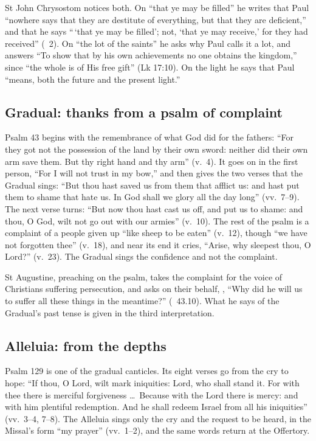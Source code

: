 St John Chrysostom notices both. On ``that ye may be filled'' he writes that
Paul ``nowhere says that they are destitute of everything, but that they are
deficient,'' and that he says ``\,`that ye may be filled'; not, `that ye may
receive,' for they had received'' (~2). On ``the lot of
the saints'' he asks why Paul calls it a lot, and answers ``To show that by
his own achievements no one obtains the kingdom,'' since ``the whole is of His
free gift'' (Lk 17:10). On the light he says that Paul ``means, both the future
and the present light.''

\subsection{Gradual: thanks from a psalm of complaint}
\label{sec:element-gradual}

Psalm 43 begins with the remembrance of what God did for the fathers: ``For
they got not the possession of the land by their own sword: neither did their
own arm save them. But thy right hand and thy arm'' (v.~4). It goes on in the
first person, ``For I will not trust in my bow,'' and then gives the two verses
that the Gradual sings: ``But thou hast saved us from them that afflict us:
and hast put them to shame that hate us. In God shall we glory all the day
long'' (vv.~7--9). The next verse turns: ``But now thou hast cast us off, and
put us to shame: and thou, O God, wilt not go out with our armies'' (v.~10).
The rest of the psalm is a complaint of a people given up ``like sheep to be
eaten'' (v.~12), though ``we have not forgotten thee'' (v.~18), and near its
end it cries, ``Arise, why sleepest thou, O Lord?'' (v.~23). The Gradual sings
the confidence and not the complaint.

St Augustine, preaching on the psalm, takes the complaint for the voice of
Christians suffering persecution, and asks on their behalf, , ``Why did he will us to suffer all
these things in the meantime?'' (~43.10). What he says of
the Gradual's past tense is given in the third interpretation.

\subsection{Alleluia: from the depths}
\label{sec:element-alleluia}

Psalm 129 is one of the gradual canticles. Its eight verses go from the cry
to hope: ``If thou, O Lord, wilt mark iniquities: Lord, who shall stand it.
For with thee there is merciful forgiveness \dots\ Because with the Lord there
is mercy: and with him plentiful redemption. And he shall redeem Israel from
all his iniquities'' (vv.~3--4, 7--8). The Alleluia sings only the cry and the
request to be heard, in the Missal's form ``my prayer'' (vv.~1--2), and the
same words return at the Offertory.

